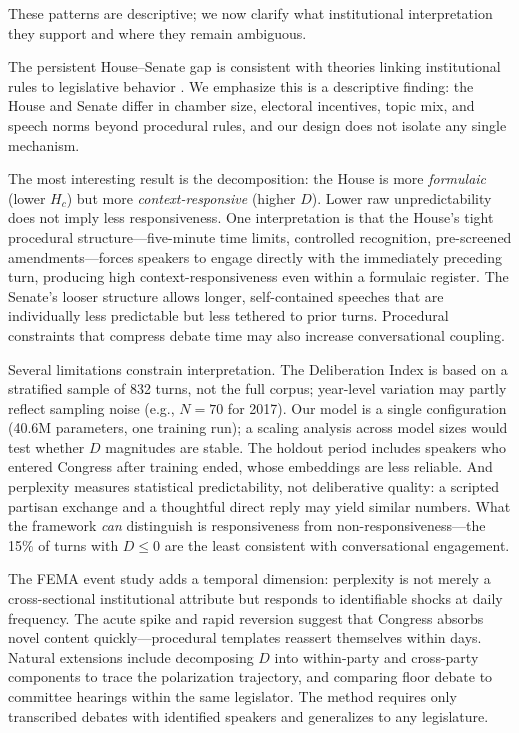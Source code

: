 \documentclass[12pt]{article}
\newcommand{\Hc}{H_c}
\newcommand{\DI}{\mathit{D}}
\begin{document}
These patterns are descriptive; we now clarify what institutional interpretation they support and where they remain ambiguous.

The persistent House--Senate gap is consistent with theories linking institutional rules to legislative behavior \citep{perssonTabellini2000, perssonTabellini2003}. We emphasize this is a descriptive finding: the House and Senate differ in chamber size, electoral incentives, topic mix, and speech norms beyond procedural rules, and our design does not isolate any single mechanism.

The most interesting result is the decomposition: the House is more \textit{formulaic} (lower $\Hc$) but more \textit{context-responsive} (higher $\DI$). Lower raw unpredictability does not imply less responsiveness. One interpretation is that the House's tight procedural structure---five-minute time limits, controlled recognition, pre-screened amendments---forces speakers to engage directly with the immediately preceding turn, producing high context-responsiveness even within a formulaic register. The Senate's looser structure allows longer, self-contained speeches that are individually less predictable but less tethered to prior turns. Procedural constraints that compress debate time may also increase conversational coupling.

Several limitations constrain interpretation. The Deliberation Index is based on a stratified sample of 832 turns, not the full corpus; year-level variation may partly reflect sampling noise (e.g., $N = 70$ for 2017). Our model is a single configuration (40.6M parameters, one training run); a scaling analysis across model sizes would test whether $\DI$ magnitudes are stable. The holdout period includes speakers who entered Congress after training ended, whose embeddings are less reliable. And perplexity measures statistical predictability, not deliberative quality: a scripted partisan exchange and a thoughtful direct reply may yield similar numbers. What the framework \textit{can} distinguish is responsiveness from non-responsiveness---the 15\% of turns with $\DI \leq 0$ are the least consistent with conversational engagement.

The FEMA event study adds a temporal dimension: perplexity is not merely a cross-sectional institutional attribute but responds to identifiable shocks at daily frequency. The acute spike and rapid reversion suggest that Congress absorbs novel content quickly---procedural templates reassert themselves within days. Natural extensions include decomposing $\DI$ into within-party and cross-party components to trace the polarization trajectory, and comparing floor debate to committee hearings within the same legislator. The method requires only transcribed debates with identified speakers and generalizes to any legislature.
\end{document}

